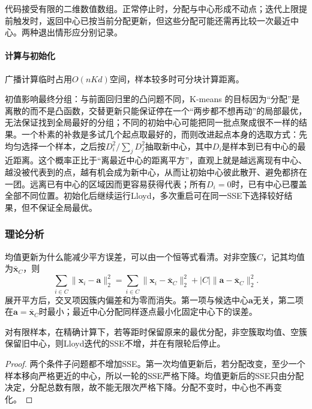 代码接受有限的二维数值数组。正常停止时，分配与中心形成不动点；迭代上限提前触发时，返回中心已按当前分配更新，但这些分配可能还需再比较一次最近中心。两种退出情形应分别记录。

\paragraph{计算与初始化}

广播计算临时占用$O(nKd)$空间，样本较多时可分块计算距离。

初值影响最终分组：与前面回归里的凸问题不同，K-means 的目标因为“分配”是离散的而不是凸函数，交替更新只能保证停在一个“两步都不想再动”的局部最优，无法保证找到全局最好的分组；不同的初始中心可能把同一批点聚成很不一样的结果。一个朴素的补救是多试几个起点取最好的，而则改进起点本身的选取方式：先均匀选择一个样本，之后按$D_i^2/\sum_jD_j^2$抽取新中心，其中$D_i$是样本到已有中心的最近距离。这个概率正比于“离最近中心的距离平方”，直观上就是越远离现有中心、越没被代表到的点，越有机会成为新中心，从而让初始中心彼此散开、避免都挤在一团。远离已有中心的区域因而更容易获得代表；所有$D_i=0$时，已有中心已覆盖全部不同位置。初始化后继续运行Lloyd，多次重启可在同一SSE下选择较好结果，但不保证全局最优。

\subsubsection{理论分析}

均值更新为什么能减少平方误差，可以由一个恒等式看清。对非空簇$C$，记其均值为$\bar{\bm x}_C$，则
\begin{equation}
 \sum_{i\in C}\lVert\bm x_i-\bm a\rVert_2^2
 =\sum_{i\in C}\lVert\bm x_i-\bar{\bm x}_C\rVert_2^2
   +|C|\lVert\bm a-\bar{\bm x}_C\rVert_2^2.
 \label{eq:clustering-mean-decomposition}
\end{equation}
展开平方后，交叉项因簇内偏差和为零而消失。第一项与候选中心$\bm a$无关，第二项在$\bm a=\bar{\bm x}_C$时最小；最近中心分配同样逐点最小化固定中心下的误差。

\begin{theorem}[Lloyd迭代的有限停止]
 \label{thm:clustering-lloyd}
 对有限样本，在精确计算下，若等距时保留原来的最优分配，非空簇取均值、空簇保留旧中心，则Lloyd迭代的SSE不增，并在有限轮后停止。
\end{theorem}
\begin{proof}
两个条件子问题都不增加SSE。第一次均值更新后，若分配改变，至少一个样本移向严格更近的中心，所以一轮的SSE严格下降。均值更新后的SSE只由分配决定，分配总数有限，故不能无限次严格下降。分配不变时，中心也不再变化。
\end{proof}

